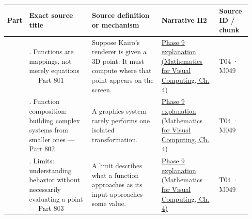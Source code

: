 {\def\LTcaptype{none} %
\begin{longtable}[]{@{}
  >{\raggedleft\arraybackslash}p{}
  >{\raggedright\arraybackslash}p{}
  >{\raggedright\arraybackslash}p{}
  >{\raggedright\arraybackslash}p{}
  >{\raggedright\arraybackslash}p{}@{}}
\toprule\noalign{}
\begin{minipage}[b]{\linewidth}\raggedleft
Part
\end{minipage} & \begin{minipage}[b]{\linewidth}\raggedright
Exact source title
\end{minipage} & \begin{minipage}[b]{\linewidth}\raggedright
Source definition or mechanism
\end{minipage} & \begin{minipage}[b]{\linewidth}\raggedright
Narrative H2
\end{minipage} & \begin{minipage}[b]{\linewidth}\raggedright
Source ID / chunk
\end{minipage} \\
\midrule\noalign{}
\endhead
\bottomrule\noalign{}
\endlastfoot
801 & 1. Functions are mappings, not merely equations --- Part 801 & Suppose Kairo's renderer is given a 3D point. It must compute where that point appears on the screen. & \href{../02-Mathematics-for-Visual-Computing/main.pdf\#nameddest=01-foundations-i-ch020-functions-limits-continuity-and-scalar-change}{Phase 9 explanation (Mathematics for Visual Computing, Ch. 4)} & T04 · M049 \\
802 & 2. Function composition: building complex systems from smaller ones --- Part 802 & A graphics system rarely performs one isolated transformation. & \href{../02-Mathematics-for-Visual-Computing/main.pdf\#nameddest=01-foundations-i-ch020-functions-limits-continuity-and-scalar-change}{Phase 9 explanation (Mathematics for Visual Computing, Ch. 4)} & T04 · M049 \\
803 & 3. Limits: understanding behavior without necessarily evaluating a point --- Part 803 & A limit describes what a function approaches as its input approaches some value. & \href{../02-Mathematics-for-Visual-Computing/main.pdf\#nameddest=01-foundations-i-ch020-functions-limits-continuity-and-scalar-change}{Phase 9 explanation (Mathematics for Visual Computing, Ch. 4)} & T04 · M049 \\

\end{longtable}}
